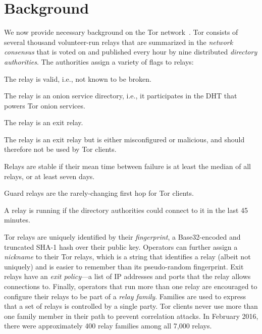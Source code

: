 \section{Background}
\label{sec:background}
We now provide necessary background on the Tor network~\cite{Dingledine2004a}.
Tor consists of several thousand volunteer-run relays that are summarized in the
\emph{network consensus} that is voted on and published every hour by nine
distributed \emph{directory authorities}.  The authorities assign a variety of
flags to relays:

\begin{description}[noitemsep]
	\item[Valid:] The relay is valid, i.e., not known to be broken.
	\item[HSDir:] The relay is an onion service directory, i.e., it participates
		in the DHT that powers Tor onion services.
	\item[Exit:] The relay is an exit relay.
	\item[BadExit:] The relay is an exit relay but is either misconfigured or
		malicious, and should therefore not be used by Tor clients.
	\item[Stable:] Relays are stable if their mean time between failure is at
		least the median of all relays, or at least seven days.
	\item[Guard:] Guard relays are the rarely-changing first hop for Tor clients.
	\item[Running:] A relay is running if the directory authorities could
		connect to it in the last 45 minutes.
\end{description}

Tor relays are uniquely identified by their \emph{fingerprint}, a
Base32-encoded and truncated SHA-1 hash over their public key.  Operators can
further assign a \emph{nickname} to their Tor relays, which is a string that
identifies a relay (albeit not uniquely) and is easier to remember than its
pseudo-random fingerprint.  Exit relays have an \emph{exit policy}---a list of
IP addresses and ports that the relay allows connections to.  Finally,
operators that run more than one relay are encouraged to configure their relays
to be part of a \emph{relay family}.  Families are used to express that a set
of relays is controlled by a single party.  Tor clients never use more than one
family member in their path to prevent correlation attacks.  In February 2016,
there were approximately 400 relay families among all 7,000 relays.
